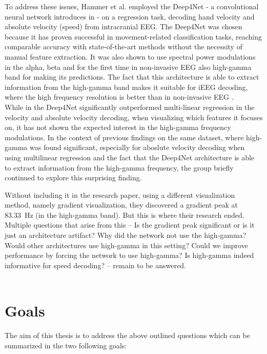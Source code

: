 To address these issues, Hammer et al. \cite{Hammer-2021} employed the Deep4Net - a convolutional neural network introduces in \cite{schirrmeister-deep-2017} - on a regression task, decoding hand velocity and absolute velocity (speed) from intracranial EEG. 
The Deep4Net was chosen because it has proven successful in movement-related classification tasks, reaching comparable accuracy with state-of-the-art methods without the necessity of manual feature extraction.
It was also shown to use spectral power modulations in the alpha, beta and for the first time in non-invasive EEG also high-gamma band for making its predictions. 
The fact that this architecture is able to extract information from the high-gamma band makes it suitable for iEEG decoding, where the high frequency resolution is better than in non-invasive EEG \cite{gamma-eeg-bad-resolution}. \\

While in \cite{Hammer-2021} the Deep4Net significantly outperformed multi-linear regression in the velocity and absolute velocity decoding, when visualizing which features it focuses on, it has not shown the expected interest in the high-gamma frequency modulations. 
In the context of previous findings on the same dataset, where high-gamma was found significant, especially for aboslute velocity decoding when using multilinear regression \cite{hammer-predominance-2016} and the fact that the Deep4Net architecture is able to extract information from the high-gamma frequency, the group briefly continued to explore this surprising finding.

Without including it in the research paper, using a different visualization method, namely gradient visualization, they discovered a gradient peak at 83.33~Hz (in the high-gamma band).
But this is where their research ended. 
Multiple questions that arise from this -- Is the gradient peak significant or is it just an architecture artifact?
Why did the network not use the high-gamma?
Would other architectures use high-gamma in this setting?
Could we improve performance by forcing the network to use high-gamma?
Is high-gamma indeed informative for speed decoding? -- remain to be answered. \\
\\


\section*{Goals}
The aim of this thesis is to address the above outlined questions which can be summarized in the two following goals:

